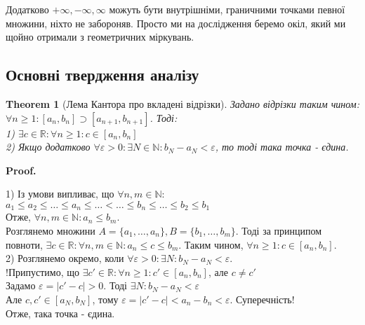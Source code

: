 \documentclass[a4paper, 14pt]{article}
\makeatletter
\def\qed{$\blacksquare$}
\theoremstyle{theoremdd}
\newtheorem{theorem}{Theorem}[subsection]
\theoremstyle{theoremdd}
\theoremstyle{theoremdd}
\theoremstyle{theoremdd}
\theoremstyle{theoremdd}
\theoremstyle{theoremdd}
\theoremstyle{theoremdd}
\theoremstyle{theoremdd}
\renewenvironment{proof}[1][Proof.\\]{\par
\pushQED{\hfill \qed}%
\normalfont \topsep6\p@\@plus6\p@\relax
\trivlist
\item\relax
{\bfseries
#1\@addpunct{.}}\hspace\labelsep\ignorespaces
}{%
\popQED\endtrivlist\@endpefalse
}
\makeatother
\begin{document}
	Додатково $+\infty, -\infty, \infty$ можуть бути внутрішніми, граничними точками певної множини, ніхто не забороняв. Просто ми на дослідження беремо окіл, який ми щойно отримали з геометричних міркувань.
\fi
	
	\subsection{Основні твердження аналізу}
	\begin{theorem}[Лема Кантора про вкладені відрізки]
	Задано відрізки таким чином: $\forall n \geq 1: [a_n, b_n] \supset [a_{n+1}, b_{n+1}]$. Тоді:\\
	1) $\exists c \in \mathbb{R}: \forall n \geq 1: c \in [a_n,b_n]$\\
	2) Якщо додатково $\forall \varepsilon > 0: \exists N \in \mathbb{N}: b_N - a_N < \varepsilon$, то тоді така точка - єдина.
	\begin{figure}[H]
	\centering
	\end{figure}
	\end{theorem}
	
	\begin{proof}
	1) Із умови випливає, що $\forall n,m \in \mathbb{N}:$\\
	$a_1 \leq a_2 \leq \dots \leq a_n \leq \dots < \dots \leq b_n \leq \dots \leq b_2 \leq b_1$\\
	Отже, $\forall n,m \in \mathbb{N}: a_n \leq b_m$.\\
	Розглянемо множини $A = \{a_1,\dots,a_n\}, B = \{b_1, \dots, b_m\}$.
	Тоді за принципом повноти, $\exists c \in \mathbb{R}: \forall n,m \in \mathbb{N}: a_n \leq c \leq b_m$.
	Таким чином, $\forall n \geq 1: c \in [a_n,b_n]$.
	\bigskip \\
	2) Розглянемо окремо, коли $\forall \varepsilon > 0: \exists N: b_N - a_N < \varepsilon$.\\
	!Припустимо, що $\exists c' \in \mathbb{R}: \forall n \geq 1: c' \in [a_n,b_n]$, але $c \neq c'$\\
	Задамо $\varepsilon = |c' - c| > 0$.
	Тоді $\exists N: b_N - a_N < \varepsilon$\\
	Але $c,c' \in [a_N,b_N]$, тому $\varepsilon = |c'-c| < a_n-b_n < \varepsilon$. Суперечність!\\
	Отже, така точка - єдина.
	\end{proof}
	
\end{document}
